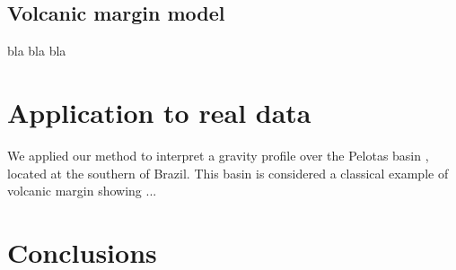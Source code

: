 \documentclass[manuscript]{geophysics}
\begin{document}
\subsection*{Volcanic margin model}

bla bla bla


\section{Application to real data}

We applied our method to interpret a gravity profile over the Pelotas basin
\citep{stica-etal2014}, located at the southern of Brazil. This basin is considered
a classical example of volcanic margin \citep{geoffroy2005} showing ...


\section{Conclusions}

\lipsum[1-3]

\end{document}
